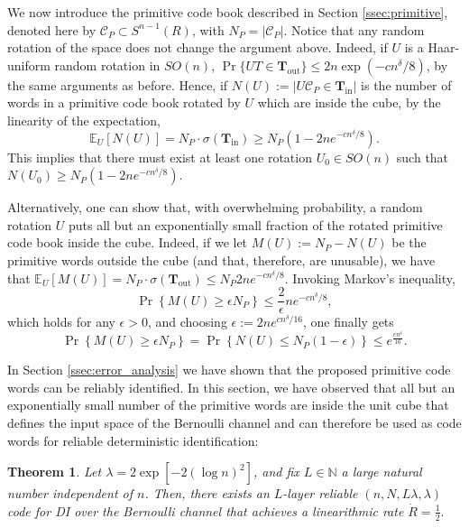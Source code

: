 \documentclass[10pt, conference]{IEEEtran}
\newtheorem{theorem}{Theorem}
\newcommand{\1}{\mathds{1}}
\newcommand{\EE}{\mathbb{E}}
\newcommand{\NN}{\mathbb{N}}
\newcommand{\cC}{\mathcal{C}}
\begin{document}
We now introduce the primitive code book described in Section \ref{ssec:primitive}, denoted here by $\cC_P\subset S^{n-1}(R)$, with $N_P=|\cC_P|$. Notice that any random rotation of the space does not change the argument above. Indeed, if $U$ is a Haar-uniform random rotation in $SO(n)$, $\Pr\{UT\in \mathbf{T}_{\text{out}}\}\leq 2n\exp\left(-cn^\delta/8\right)$, by the same arguments as before. Hence, if $N(U):=|U\cC_P\in\mathbf{T}_\text{in}|$ is the number of words in a primitive code book rotated by $U$ which are inside the cube, by the linearity of the expectation, 
\begin{equation}
    \EE_U[N(U)]=N_P\cdot\sigma(\mathbf{T}_\text{in})\geq N_P\left(1-2ne^{-cn^\delta/8}\right).
\end{equation}
This implies that there must exist at least one rotation $U_0\in SO(n)$ such that $N(U_0)\geq N_P\left(1-2ne^{-cn^\delta/8}\right)$. 

Alternatively, one can show that, with overwhelming probability, a random rotation $U$ puts all but an exponentially small fraction of the rotated primitive code book inside the cube. Indeed, if we let $M(U):=N_P-N(U)$ be the primitive words outside the cube (and that, therefore, are unusable), we have that $\EE_U[M(U)]=N_P\cdot\sigma(\mathbf{T}_\text{out})\leq N_P2ne^{-cn^\delta/8}$. Invoking Markov's inequality,
\begin{equation}
\Pr\left\{M(U)\geq \epsilon N_P\right\}\leq\frac2\epsilon ne^{-cn^\delta/8}, 
\end{equation}
which holds for any $\epsilon>0$, and choosing $\epsilon:=2ne^{cn^\delta/16}$, one finally gets
\begin{equation}
\!\!\!\Pr\left\{M(U)\!\geq \!\epsilon N_P\!\right\}=\Pr\left\{N(U)\!\leq\! N_P(1-\epsilon)\right\}\leq e^{\frac{cn^\delta}{16}}\!.
\end{equation}

In Section \ref{ssec:error_analysis} we have shown that the proposed primitive code words can be reliably identified. In this section, we have observed that all but an exponentially small number of the primitive words are inside the unit cube that defines the input space of the Bernoulli channel and can therefore be used as code words for reliable deterministic identification:
\begin{theorem}\label{thm:Bernoulli}
Let $\lambda=2\exp\left[-2(\log n)^2\right]$, and fix $L\in \NN$ a large natural number independent of $n$. Then, there exists an $L$-layer reliable $(n,N,L\lambda,\lambda)$ code for DI over the Bernoulli channel that achieves a linearithmic rate 
\(
\dot{R}=\frac{1}{2}.
\)
\end{theorem}
\end{document}
